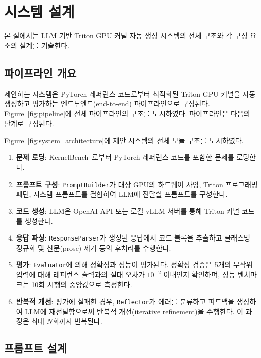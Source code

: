 \documentclass[sigplan,screen,review,anonymous]{acmart}
\begin{document}
\section{시스템 설계}
\label{sec:system_design}

본 절에서는 LLM 기반 Triton GPU 커널 자동 생성 시스템의 전체 구조와 각 구성 요소의 설계를 기술한다.

\subsection{파이프라인 개요}

제안하는 시스템은 PyTorch 레퍼런스 코드로부터 최적화된 Triton GPU 커널을 자동 생성하고 평가하는 엔드투엔드(end-to-end) 파이프라인으로 구성된다. Figure~\ref{fig:pipeline}에 전체 파이프라인의 구조를 도시하였다. 파이프라인은 다음의 단계로 구성된다.



Figure~\ref{fig:system_architecture}에 제안 시스템의 전체 모듈 구조를 도시하였다.


\begin{enumerate}
    \item \textbf{문제 로딩}: KernelBench~\cite{ouyang2024kernelbench}로부터 PyTorch 레퍼런스 코드를 포함한 문제를 로딩한다.
    \item \textbf{프롬프트 구성}: \texttt{PromptBuilder}가 대상 GPU의 하드웨어 사양, Triton 프로그래밍 패턴, 시스템 프롬프트를 결합하여 LLM에 전달할 프롬프트를 구성한다.
    \item \textbf{코드 생성}: LLM은 OpenAI API 또는 로컬 vLLM 서버를 통해 Triton 커널 코드를 생성한다.
    \item \textbf{응답 파싱}: \texttt{ResponseParser}가 생성된 응답에서 코드 블록을 추출하고 클래스명 정규화 및 산문(prose) 제거 등의 후처리를 수행한다.
    \item \textbf{평가}: \texttt{Evaluator}에 의해 정확성과 성능이 평가된다. 정확성 검증은 5개의 무작위 입력에 대해 레퍼런스 출력과의 절대 오차가 $10^{-2}$ 이내인지 확인하며, 성능 벤치마크는 10회 시행의 중앙값으로 측정한다.
    \item \textbf{반복적 개선}: 평가에 실패한 경우, \texttt{Reflector}가 에러를 분류하고 피드백을 생성하여 LLM에 재전달함으로써 반복적 개선(iterative refinement)을 수행한다. 이 과정은 최대 $N$회까지 반복된다.
\end{enumerate}

\subsection{프롬프트 설계}
\end{document}
